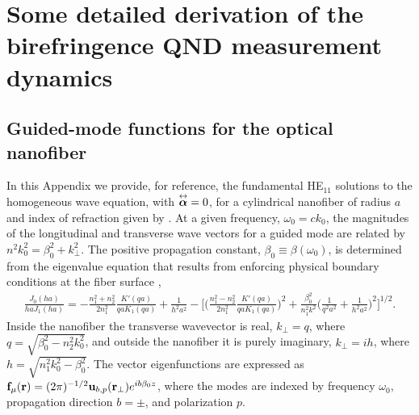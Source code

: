 \chapter[Deriving birefringence QND measurement dynamics]{Some detailed derivation of the birefringence QND measurement dynamics}


\section{Guided-mode functions for the optical nanofiber} \label{Appendix::ModeFunctions}

  

In this Appendix we provide, for reference, the fundamental HE$_{11}$ solutions to the homogeneous wave equation,  with $\overset{\leftrightarrow}{\boldsymbol{\alpha}} = 0$, for a cylindrical nanofiber of radius $a$ and index of refraction given by .  At a given frequency, $\omega_0 = c k_0$, the magnitudes of the longitudinal and transverse wave vectors for a guided mode are related by $n^2 k_0^2 = \beta_0^2 + k_\perp^2$.  
The positive propagation constant, $\beta_0 \equiv \beta(\omega_0)$, is determined from the eigenvalue equation that results from enforcing physical boundary conditions at the fiber surface \cite{snyder_optical_1983},
	\begin{align}
		\frac{J_0(ha)}{ha J_1(ha)} = - \frac{n_1^2+n_2^2}{2n_1^2} \frac{K'(qa)}{qa K_1(qa)} + \frac{1}{h^2 a^2} - \bigg[ \bigg(\frac{n_1^2 - n_2^2}{2 n_1^2} \frac{K'(qa)}{qa K_1(qa)} \bigg)^2  + \frac{\beta_0^2}{n^2_1 k^2} \bigg(\frac{1}{q^2a^2} + \frac{1}{h^2a^2} \bigg)^2 \bigg]^{1/2}.
	\end{align}
Inside the nanofiber the transverse wavevector is real, $k_\perp = q$, where $q=\sqrt{\beta_0^2- n_2^2k_0^2}$, and outside the nanofiber it is purely imaginary, $k_\perp = i h$, where $h=\sqrt{n_1^2 k_0^2 - \beta_0^2}$.  The vector eigenfunctions are expressed as $\mathbf{f}_{\mu}(\mathbf{r}) = (2\pi)^{-1/2}\mathbf{u}_{b,p}(\mathbf{r}_\perp) e^{i b \beta_0 z}$, where the modes are indexed by frequency $\omega_0$, propagation direction $b = \pm$, and polarization $p$.

